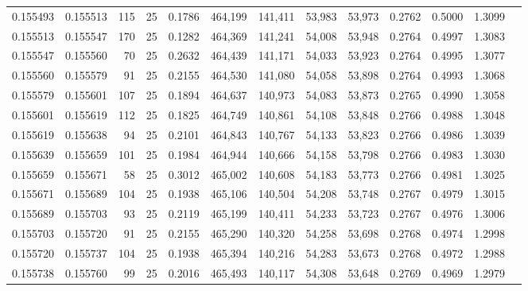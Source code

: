 \begin{tabular}{rrrrrrrrrrrrr}
0.155493 & 0.155513 &   115 &  25 &                                     0.1786 & 464,199 & 141,411 &  53,983 &  53,973 & 0.2762 & 0.5000 & 1.3099 \\
0.155513 & 0.155547 &   170 &  25 &                                     0.1282 & 464,369 & 141,241 &  54,008 &  53,948 & 0.2764 & 0.4997 & 1.3083 \\
0.155547 & 0.155560 &    70 &  25 &                                     0.2632 & 464,439 & 141,171 &  54,033 &  53,923 & 0.2764 & 0.4995 & 1.3077 \\
0.155560 & 0.155579 &    91 &  25 &                                     0.2155 & 464,530 & 141,080 &  54,058 &  53,898 & 0.2764 & 0.4993 & 1.3068 \\
0.155579 & 0.155601 &   107 &  25 &                                     0.1894 & 464,637 & 140,973 &  54,083 &  53,873 & 0.2765 & 0.4990 & 1.3058 \\
0.155601 & 0.155619 &   112 &  25 &                                     0.1825 & 464,749 & 140,861 &  54,108 &  53,848 & 0.2766 & 0.4988 & 1.3048 \\
0.155619 & 0.155638 &    94 &  25 &                                     0.2101 & 464,843 & 140,767 &  54,133 &  53,823 & 0.2766 & 0.4986 & 1.3039 \\
0.155639 & 0.155659 &   101 &  25 &                                     0.1984 & 464,944 & 140,666 &  54,158 &  53,798 & 0.2766 & 0.4983 & 1.3030 \\
0.155659 & 0.155671 &    58 &  25 &                                     0.3012 & 465,002 & 140,608 &  54,183 &  53,773 & 0.2766 & 0.4981 & 1.3025 \\
0.155671 & 0.155689 &   104 &  25 &                                     0.1938 & 465,106 & 140,504 &  54,208 &  53,748 & 0.2767 & 0.4979 & 1.3015 \\
0.155689 & 0.155703 &    93 &  25 &                                     0.2119 & 465,199 & 140,411 &  54,233 &  53,723 & 0.2767 & 0.4976 & 1.3006 \\
0.155703 & 0.155720 &    91 &  25 &                                     0.2155 & 465,290 & 140,320 &  54,258 &  53,698 & 0.2768 & 0.4974 & 1.2998 \\
0.155720 & 0.155737 &   104 &  25 &                                     0.1938 & 465,394 & 140,216 &  54,283 &  53,673 & 0.2768 & 0.4972 & 1.2988 \\
0.155738 & 0.155760 &    99 &  25 &                                     0.2016 & 465,493 & 140,117 &  54,308 &  53,648 & 0.2769 & 0.4969 & 1.2979 \\

\end{tabular}

